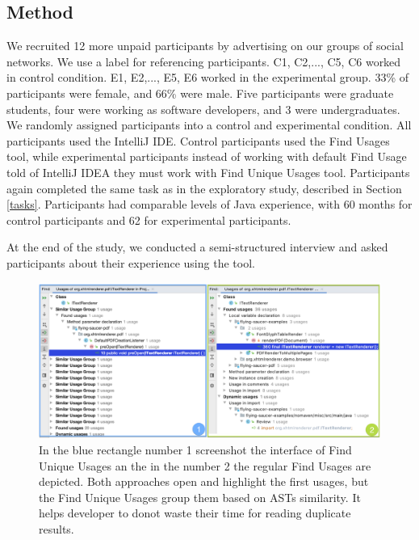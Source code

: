 \documentclass[conference]{IEEEtran}
\begin{document}
\subsection{Method}

We recruited 12 more unpaid participants by advertising on our groups of social networks. We use a label for referencing participants. C1, C2,..., C5, C6 worked in control condition. E1, E2,..., E5, E6 worked in the experimental group. 33\% of participants were female, and 66\% were male. Five participants were graduate students, four were working as software developers, and 3 were undergraduates. We randomly assigned participants into a control and experimental condition. All participants used the IntelliJ IDE. Control participants used the Find Usages tool, while experimental participants instead of working with default Find Usage told of IntelliJ IDEA they must work with Find Unique Usages tool. 
Participants again completed the same task as in the exploratory study, described in Section \ref{tasks}. Participants had comparable levels of Java experience, with 60 months for control participants and 62 for experimental participants.\par 
At the end of the study, we conducted a semi-structured interview and asked participants about their experience using the tool.

\begin{figure}[h]
    \centering
    \includegraphics [width=\textwidth,keepaspectratio,clip]{figures/compare}
    \caption{In the blue rectangle number 1 screenshot the interface of Find Unique Usages an the in the number 2 the regular Find Usages are depicted. Both approaches open and highlight the first usages, but the Find Unique Usages group them based on ASTs similarity. It helps developer to donot waste their time for reading duplicate results.  }
\label{fig:compare}
\end{figure}
\end{document}
